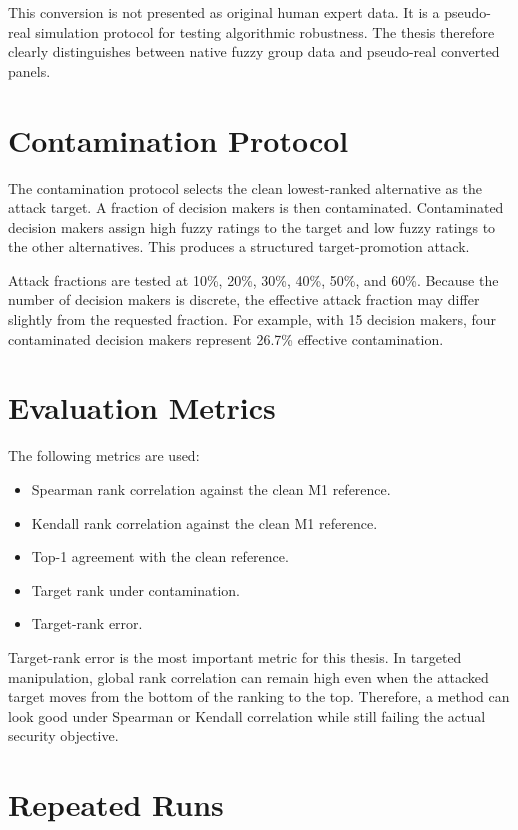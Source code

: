 This conversion is not presented as original human expert data. It is a pseudo-real simulation protocol for testing algorithmic robustness. The thesis therefore clearly distinguishes between native fuzzy group data and pseudo-real converted panels.

\section{Contamination Protocol}

The contamination protocol selects the clean lowest-ranked alternative as the attack target. A fraction of decision makers is then contaminated. Contaminated decision makers assign high fuzzy ratings to the target and low fuzzy ratings to the other alternatives. This produces a structured target-promotion attack.

Attack fractions are tested at 10\%, 20\%, 30\%, 40\%, 50\%, and 60\%. Because the number of decision makers is discrete, the effective attack fraction may differ slightly from the requested fraction. For example, with 15 decision makers, four contaminated decision makers represent 26.7\% effective contamination.

\section{Evaluation Metrics}

The following metrics are used:

\begin{itemize}
    \item Spearman rank correlation against the clean M1 reference.
    \item Kendall rank correlation against the clean M1 reference.
    \item Top-1 agreement with the clean reference.
    \item Target rank under contamination.
    \item Target-rank error.
\end{itemize}

Target-rank error is the most important metric for this thesis. In targeted manipulation, global rank correlation can remain high even when the attacked target moves from the bottom of the ranking to the top. Therefore, a method can look good under Spearman or Kendall correlation while still failing the actual security objective.

\section{Repeated Runs}

